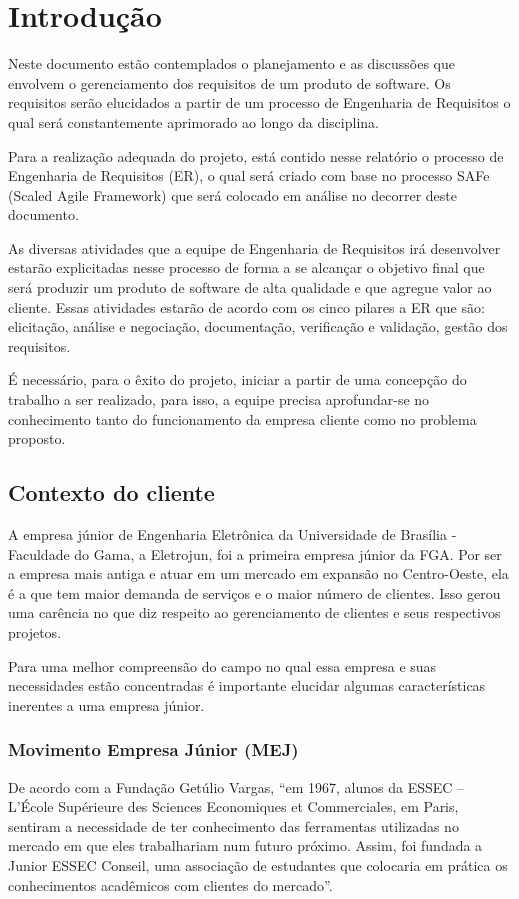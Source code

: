 \chapter[Introdução]{Introdução}

Neste documento estão contemplados o planejamento e as discussões que envolvem o gerenciamento dos requisitos de um produto de software. Os requisitos serão elucidados a partir de um processo de Engenharia de Requisitos o qual será constantemente aprimorado ao longo da disciplina.

Para a realização adequada do projeto, está contido nesse relatório o processo de Engenharia de Requisitos (ER), o qual será criado com base no processo SAFe (Scaled Agile Framework) que será colocado em análise no decorrer deste documento.

As diversas atividades que a equipe de Engenharia de Requisitos irá desenvolver estarão explicitadas nesse processo de forma a se alcançar o objetivo final que será produzir um produto de software de alta qualidade e que agregue valor ao cliente. Essas atividades estarão de acordo com os cinco pilares a ER que são: elicitação, análise e negociação, documentação, verificação e validação, gestão dos requisitos.

É necessário, para o êxito do projeto, iniciar a partir de uma concepção do trabalho a ser realizado, para isso, a equipe precisa aprofundar-se no conhecimento tanto do funcionamento da empresa cliente como no problema proposto.

  \section{Contexto do cliente}
A empresa júnior de Engenharia Eletrônica da Universidade de Brasília - Faculdade do Gama, a Eletrojun, foi a primeira empresa júnior da FGA. Por ser a empresa mais antiga e atuar em um mercado em expansão no Centro-Oeste, ela é a que tem maior demanda de serviços e o maior número de clientes. Isso gerou uma carência no que diz respeito ao gerenciamento de clientes e seus respectivos projetos.

Para uma melhor compreensão do campo no qual essa empresa e suas necessidades estão concentradas é importante elucidar algumas características inerentes a uma empresa júnior.

\subsection{Movimento Empresa Júnior (MEJ)}
De acordo com a Fundação Getúlio Vargas, “em 1967, alunos da ESSEC – L’École Supérieure des Sciences Economiques et Commerciales, em Paris, sentiram a necessidade de ter conhecimento das ferramentas utilizadas no mercado em que eles trabalhariam num futuro próximo. Assim, foi fundada a Junior ESSEC Conseil, uma associação de estudantes que colocaria em prática os conhecimentos acadêmicos com clientes do mercado”.

